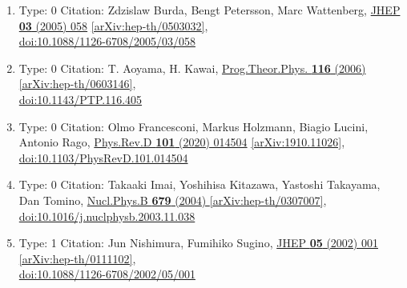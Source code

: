 \documentclass[a4paper,10pt]{article}
\begin{document}
\begin{enumerate}
\begin{enumerate}
  \item Type: 0 Citation: Zdzislaw Burda, Bengt Petersson, Marc Wattenberg, \href{https://www.doi.org/10.1088/1126-6708/2005/03/058}{JHEP {\bf 03} (2005) 058}  \href{https://arxiv.org/abs/hep-th/0503032}{[arXiv:hep-th/0503032]},\\\href{https://www.doi.org/10.1088/1126-6708/2005/03/058}{doi:10.1088/1126-6708/2005/03/058}
  \item Type: 0 Citation: T. Aoyama, H. Kawai, \href{https://www.doi.org/10.1143/PTP.116.405}{Prog.Theor.Phys. {\bf 116} (2006) }  \href{https://arxiv.org/abs/hep-th/0603146}{[arXiv:hep-th/0603146]},\\\href{https://www.doi.org/10.1143/PTP.116.405}{doi:10.1143/PTP.116.405}
  \item Type: 0 Citation: Olmo Francesconi, Markus Holzmann, Biagio Lucini, Antonio Rago, \href{https://www.doi.org/10.1103/PhysRevD.101.014504}{Phys.Rev.D {\bf 101} (2020) 014504}  \href{https://arxiv.org/abs/1910.11026}{[arXiv:1910.11026]},\\\href{https://www.doi.org/10.1103/PhysRevD.101.014504}{doi:10.1103/PhysRevD.101.014504}
  \item Type: 0 Citation: Takaaki Imai, Yoshihisa Kitazawa, Yastoshi Takayama, Dan Tomino, \href{https://www.doi.org/10.1016/j.nuclphysb.2003.11.038}{Nucl.Phys.B {\bf 679} (2004) }  \href{https://arxiv.org/abs/hep-th/0307007}{[arXiv:hep-th/0307007]},\\\href{https://www.doi.org/10.1016/j.nuclphysb.2003.11.038}{doi:10.1016/j.nuclphysb.2003.11.038}
  \item Type: 1 Citation: Jun Nishimura, Fumihiko Sugino, \href{https://www.doi.org/10.1088/1126-6708/2002/05/001}{JHEP {\bf 05} (2002) 001}  \href{https://arxiv.org/abs/hep-th/0111102}{[arXiv:hep-th/0111102]},\\\href{https://www.doi.org/10.1088/1126-6708/2002/05/001}{doi:10.1088/1126-6708/2002/05/001}

\end{enumerate}
\end{enumerate}
\end{document}
